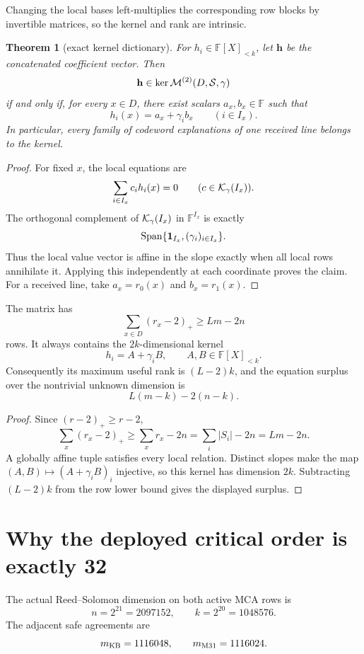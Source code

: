 \documentclass[11pt,a4paper]{amsart}
\numberwithin{equation}{section}
\newtheorem{theorem}{Theorem}[section]
\theoremstyle{remark}
\newcommand{\F}{\mathbb F}\newcommand{\B}{\mathbb B}\newcommand{\K}{\mathbb K}\newcommand{\Z}{\mathbb Z}
\newcommand{\one}{\mathbf 1}\newcommand{\Fq}{\mathbb F_q}
\begin{document}
Changing the local bases left-multiplies the corresponding row blocks by invertible matrices, so the kernel and rank are intrinsic.

\begin{theorem}[exact kernel dictionary]\label{thm:kernel-dictionary}
For $h_i\in\F[X]_{<k}$, let $\mathbf h$ be the concatenated coefficient vector.  Then
\[
 \mathbf h\in\ker\mathcal M^{(2)}(D,\mathcal S,\gamma)
\]
if and only if, for every $x\in D$, there exist scalars $a_x,b_x\in\F$ such that
\[
 h_i(x)=a_x+\gamma_i b_x
 \qquad(i\in I_x).
\]
In particular, every family of codeword explanations of one received line belongs to the kernel.
\end{theorem}

\begin{proof}
For fixed $x$, the local equations are
\[
 \sum_{i\in I_x}c_i h_i(x)=0
 \qquad(c\in\mathcal K_\gamma(I_x)).
\]
The orthogonal complement of $\mathcal K_\gamma(I_x)$ in $\F^{I_x}$ is exactly
\[
 \Span\{\one_{I_x},(\gamma_i)_{i\in I_x}\}.
\]
Thus the local value vector is affine in the slope exactly when all local rows annihilate it.  Applying this independently at each coordinate proves the claim.  For a received line, take $a_x=r_0(x)$ and $b_x=r_1(x)$.
\end{proof}

\begin{proposition}\label{prop:row-count}
The matrix has
\[
 \sum_{x\in D}(r_x-2)_+
 \ge Lm-2n
\]
rows.  It always contains the $2k$-dimensional kernel
\[
 h_i=A+\gamma_iB,
 \qquad A,B\in\F[X]_{<k}.
\]
Consequently its maximum useful rank is $(L-2)k$, and the equation surplus over the nontrivial unknown dimension is
\[
 \boxed{\ L(m-k)-2(n-k).\ }
\]
\end{proposition}

\begin{proof}
Since $(r-2)_+\ge r-2$,
\[
 \sum_x(r_x-2)_+
 \ge\sum_xr_x-2n
 =\sum_i|S_i|-2n
 =Lm-2n.
\]
A globally affine tuple satisfies every local relation.  Distinct slopes make the map $(A,B)\mapsto(A+\gamma_iB)_i$ injective, so this kernel has dimension $2k$.  Subtracting $(L-2)k$ from the row lower bound gives the displayed surplus.
\end{proof}

\section{Why the deployed critical order is exactly 32}

The actual Reed--Solomon dimension on both active MCA rows is
\[
 n=2^{21}=2097152,
 \qquad k=2^{20}=1048576.
\]
The adjacent safe agreements are
\[
 m_{\rm KB}=1116048,
 \qquad
 m_{\rm M31}=1116024.
\]
\end{document}
